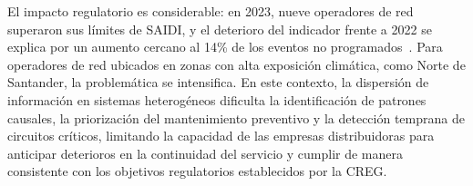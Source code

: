 El impacto regulatorio es considerable: en 2023, nueve operadores de red superaron sus límites de SAIDI, y el deterioro del indicador frente a 2022 se explica por un aumento cercano al 14\% de los eventos no programados~\cite[pp.~18--19]{ref46}. Para operadores de red ubicados en zonas con alta exposición climática, como Norte de Santander, la problemática se intensifica. En este contexto, la dispersión de información en sistemas heterogéneos dificulta la identificación de patrones causales, la priorización del mantenimiento preventivo y la detección temprana de circuitos críticos, limitando la capacidad de las empresas distribuidoras para anticipar deterioros en la continuidad del servicio y cumplir de manera consistente con los objetivos regulatorios establecidos por la CREG.



